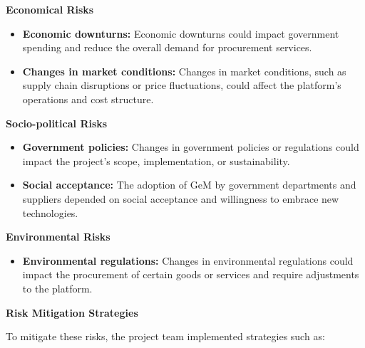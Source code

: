\textbf{Economical Risks}

\begin{itemize}
    \item \textbf{Economic downturns:} Economic downturns could impact government spending and reduce the overall demand for procurement services.
    \item \textbf{Changes in market conditions:} Changes in market conditions, such as supply chain disruptions or price fluctuations, could affect the platform's operations and cost structure.
\end{itemize}

\textbf{Socio-political Risks}

\begin{itemize}
    \item \textbf{Government policies:} Changes in government policies or regulations could impact the project's scope, implementation, or sustainability.
    \item \textbf{Social acceptance:} The adoption of GeM by government departments and suppliers depended on social acceptance and willingness to embrace new technologies.
\end{itemize}

\textbf{Environmental Risks}

\begin{itemize}
    \item \textbf{Environmental regulations:} Changes in environmental regulations could impact the procurement of certain goods or services and require adjustments to the platform.
\end{itemize}

\textbf{Risk Mitigation Strategies}

To mitigate these risks, the project team implemented strategies such as:

